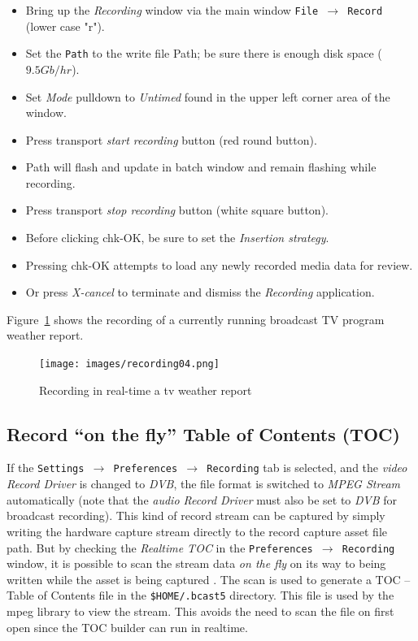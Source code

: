 \begin{itemize}
    \item Bring up the \textit{Recording} window via the main window   \texttt{File $\rightarrow$ Record}   (lower case "r").
    \item Set the \texttt{Path} to the write file Path; be sure there is enough disk space ($9.5Gb/hr$).
    \item Set \textit{Mode} pulldown to \textit{Untimed} found in the upper left corner area of the window.
    \item Press transport \textit{start recording} button (red round button).
    \item Path will flash and update in batch window and remain flashing while recording.
    \item Press transport \textit{stop recording} button (white square button).
    \item Before clicking chk-OK, be sure to set the \textit{Insertion strategy}.
    \item Pressing chk-OK attempts to load any newly recorded media data for review.
    \item Or press \textit{X-cancel} to terminate and dismiss the \textit{Recording} application.
\end{itemize}

Figure~\ref{fig:recording04} shows the recording of a currently running broadcast TV program weather report.

\begin{figure}[htpb]
    \centering
    \texttt{[image: images/recording04.png]}
    \caption{Recording in real-time a tv weather report}
    \label{fig:recording04}
\end{figure}

\subsection{Record “on the fly” Table of Contents (TOC)}%
\label{sub:record_on_the_fly_toc}

If the \texttt{Settings $\rightarrow$ Preferences $\rightarrow$ Recording} tab is selected, and the \textit{video Record Driver} is changed to \textit{DVB}, the file format is switched to \textit{MPEG Stream} automatically (note that the \textit{audio Record Driver} must also be set to \textit{DVB} for broadcast recording).  This kind of record stream can be captured by simply writing the hardware capture stream directly to the record capture asset file path.  But by checking the \textit{Realtime TOC} in the \texttt{Preferences $\rightarrow$ Recording} window, it is possible to scan the stream data \textit{on the fly} on its way to being written while the asset is being captured .  The scan is used to generate a TOC – Table of Contents file in the \texttt{\$HOME/.bcast5} directory.  This file is used by the mpeg library to view the stream.  This avoids the need to scan the file on first open since the TOC builder can run in realtime.

